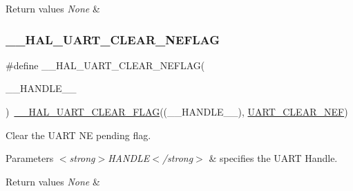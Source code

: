 \begin{DoxyRetVals}{Return values}
{\em None} & \\
\hline
\end{DoxyRetVals}
\mbox{\label{group___u_a_r_t___exported___macros_gaa1f69421585b3ada4d2b81d502a3ae6b}} 
\subsubsection{\texorpdfstring{\_\_HAL\_UART\_CLEAR\_NEFLAG}{\_\_HAL\_UART\_CLEAR\_NEFLAG}}
{\footnotesize\ttfamily \#define \+\_\+\+\_\+\+H\+A\+L\+\_\+\+U\+A\+R\+T\+\_\+\+C\+L\+E\+A\+R\+\_\+\+N\+E\+F\+L\+AG(\begin{DoxyParamCaption}\item[{}]{\+\_\+\+\_\+\+H\+A\+N\+D\+L\+E\+\_\+\+\_\+ }\end{DoxyParamCaption})~\mbox{\hyperlink{group___u_a_r_t___exported___macros_ga9bd035161d41cde4f2568c7af06493bf}{\+\_\+\+\_\+\+H\+A\+L\+\_\+\+U\+A\+R\+T\+\_\+\+C\+L\+E\+A\+R\+\_\+\+F\+L\+AG}}((\+\_\+\+\_\+\+H\+A\+N\+D\+L\+E\+\_\+\+\_\+), \mbox{\hyperlink{group___u_a_r_t___i_t___c_l_e_a_r___flags_gad5b9aafb495296d917a5d85e63383396}{U\+A\+R\+T\+\_\+\+C\+L\+E\+A\+R\+\_\+\+N\+EF}})}



Clear the U\+A\+RT NE pending flag. 


\begin{DoxyParams}{Parameters}
{\em $<$strong$>$\+H\+A\+N\+D\+L\+E$<$/strong$>$} & specifies the U\+A\+RT Handle. \\
\hline
\end{DoxyParams}

\begin{DoxyRetVals}{Return values}
{\em None} & \\
\hline
\end{DoxyRetVals}
\mbox{\label{group___u_a_r_t___exported___macros_ga9cdc2f2d55eaaa7895996bf6848df42e}} 
